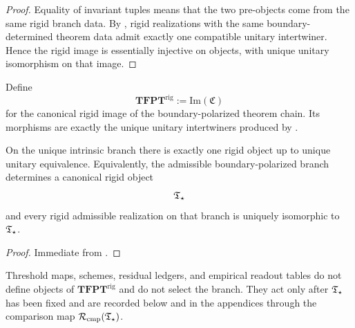 \begin{proof}
Equality of invariant tuples means that the two pre-objects come from the same rigid branch data.
By , rigid realizations with the same
boundary-determined theorem data admit exactly one compatible unitary intertwiner. Hence the rigid
image is essentially injective on objects, with unique unitary isomorphism on that image.
\end{proof}

\begin{definition}
\label{def:tfpt-rigid-category}
Define
\[
\mathbf{TFPT}^{\mathrm{rig}}
:=
\mathrm{Im}(\mathfrak C)
\]
for the canonical rigid image of the boundary-polarized theorem chain. Its morphisms are exactly
the unique unitary intertwiners produced by
.
\end{definition}

\begin{corollary}
\label{thm:no-alternatives-tfpt}
\label{cor:no-alternatives-tfpt}
\label{cor:canonical-rigid-object-unique-branch}
On the unique intrinsic branch there is exactly one rigid object up to unique unitary equivalence.
Equivalently, the admissible boundary-polarized branch determines a canonical rigid object
\[
\mathfrak T_{\star}
\]
and every rigid admissible realization on that branch is uniquely isomorphic to $\mathfrak T_{\star}$.
\end{corollary}

\begin{proof}
Immediate from
.
\end{proof}

\begin{remark}
Threshold maps, schemes, residual ledgers, and empirical readout tables do not define objects of
$\mathbf{TFPT}^{\mathrm{rig}}$ and do not select the branch. They act only after
$\mathfrak T_{\star}$ has been fixed and are recorded below and in the appendices through the comparison map
$\mathcal R_{\mathrm{cmp}}(\mathfrak T_{\star})$.
\end{remark}

